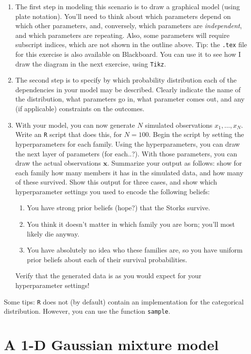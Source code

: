 \documentclass[a4paper]{article}
\renewcommand{\v}[1]{\mathbf{\bm #1}}
\begin{document}
\begin{enumerate}
    \item The first step in modeling this scenario is to draw a graphical model (using plate notation). You'll need to think about which parameters depend on which other parameters, and, conversely, which parameters are \emph{independent}, and which parameters are repeating. Also, some parameters will require subscript indices, which are not shown in the outline above. Tip: the \texttt{.tex} file for this exercise is also available on Blackboard. You can use it to see how I draw the diagram in the next exercise, using \texttt{Tikz}.
    \item The second step is to specify by which probability distribution each of the dependencies in your model may be described. Clearly indicate the name of the distribution, what parameters go in, what parameter comes out, and any (if applicable) constraints on the outcomes.
    \item With your model, you can now generate $N$ simulated observations $x_1,\ldots,x_N$. Write an \texttt{R} script that does this, for $N=100$. Begin the script by setting the hyperparameters for each family. Using the hyperparameters, you can draw the next layer of parameters (for each..?). With those parameters, you can draw the actual observations $\v{x}$. Summarize your output as follows: show for each family how many members it has in the simulated data, and how many of these survived. Show this output for three cases, and show which hyperparameter settings you used to encode the following beliefs:
        \begin{enumerate}
          \item You have strong prior beliefs (hope?) that the Storks survive.
          \item You think it doesn't matter in which family you are born; you'll most likely die anyway.
          \item You have absolutely no idea who these families are, so you have uniform prior beliefs about each of their survival probabilities.
        \end{enumerate}
        Verify that the generated data is as you would expect for your hyperparameter settings!
\end{enumerate}

Some tips: \texttt{R} does not (by default) contain an implementation for the categorical distribution. However, you can use the function \texttt{sample}.

\section{A 1-D Gaussian mixture model}
\end{document}
